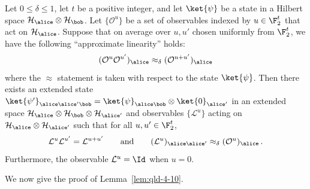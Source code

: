 	\begin{theorem}
	\label{thm:linearity}
		Let $0 \leq \delta \leq 1$, let $t$ be a positive integer, and let $\ket{\psi}$ be a state in a Hilbert space $\mathcal{H}_\alice \otimes \mathcal{H}_\bob$. Let $\{\mathcal{O}^u \}$ be a set of observables indexed by $u \in \F_2^t$ that act on $\mathcal{H}_\alice$. Suppose that on average over $u, u'$ chosen uniformly from $\F_2^t$, we have the following ``approximate linearity'' holds:
		\[
(\mathcal{O}^u \mathcal{O}^{u'})_{\alice} \approx_\delta (\mathcal{O}^{u+u'})_{\alice}
		\]
		where the $\approx$ statement is taken with respect to the state $\ket{\psi}$. 
Then there exists an extended state $\ket{\psi'}_{\alice \alice' \bob} = \ket{\psi}_{\alice \bob} \otimes \ket{0}_{\alice'}$ in an extended space $\mathcal{H}_{\alice} \otimes \mathcal{H}_\bob \otimes \mathcal{H}_{\alice'}$ and observables $\{ \mathcal{L}^u \}$ acting on $\mathcal{H}_\alice \otimes \mathcal{H}_{\alice'}$ such that for all $u, u' \in \F_2^t$, 
		\[
			\mathcal{L}^u \mathcal{L}^{u'} = \mathcal{L}^{u + u'} \qquad \text{and} \qquad (\mathcal{L}^u)_{\alice \alice'} \approx_\delta (\mathcal{O}^u)_\alice \,.
		\]
		Furthermore, the observable $\mathcal{L}^u = \Id$ when $u = 0$.
	\end{theorem}
		
		We now give the proof of Lemma~\ref{lem:qld-4-10}.
		

